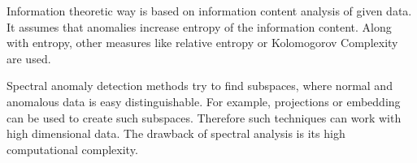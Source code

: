 Information theoretic way is based on information content analysis of given data.
It assumes that anomalies increase entropy of the information content.
Along with entropy, other measures like relative entropy or Kolomogorov Complexity are used.

Spectral anomaly detection methods try to find subspaces, where normal and anomalous data is easy distinguishable.
For example, projections or embedding can be used to create such subspaces.
Therefore such techniques can work with high dimensional data.
The drawback of spectral analysis is its high computational complexity.   